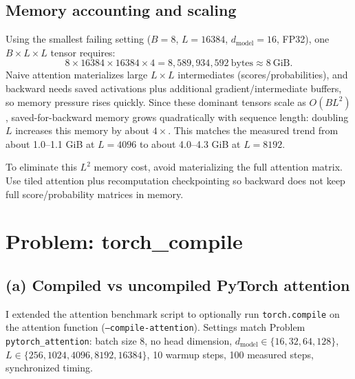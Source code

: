 \documentclass[11pt]{article}
\begin{document}
\subsection*{Memory accounting and scaling}
Using the smallest failing setting (\(B{=}8\), \(L{=}16384\), \(d_{\text{model}}{=}16\), FP32), one \(B \times L \times L\) tensor requires:
\[
8 \times 16384 \times 16384 \times 4 = 8{,}589{,}934{,}592\ \text{bytes} \approx 8\ \text{GiB}.
\]
Naive attention materializes large \(L \times L\) intermediates (scores/probabilities), and backward needs saved activations plus additional gradient/intermediate buffers, so memory pressure rises quickly. Since these dominant tensors scale as \(O(BL^2)\), saved-for-backward memory grows quadratically with sequence length: doubling \(L\) increases this memory by about \(4\times\). This matches the measured trend from about 1.0--1.1 GiB at \(L{=}4096\) to about 4.0--4.3 GiB at \(L{=}8192\).

To eliminate this \(L^2\) memory cost, avoid materializing the full attention matrix.
Use tiled attention plus recomputation checkpointing so backward does not keep full score/probability matrices in memory.

\section{Problem: torch\_compile}
\subsection*{(a) Compiled vs uncompiled PyTorch attention}
I extended the attention benchmark script to optionally run \texttt{torch.compile} on the attention function (\texttt{--compile-attention}). Settings match Problem \texttt{pytorch\_attention}: batch size 8, no head dimension, \(d_{\text{model}} \in \{16,32,64,128\}\), \(L \in \{256,1024,4096,8192,16384\}\), 10 warmup steps, 100 measured steps, synchronized timing.
\end{document}
